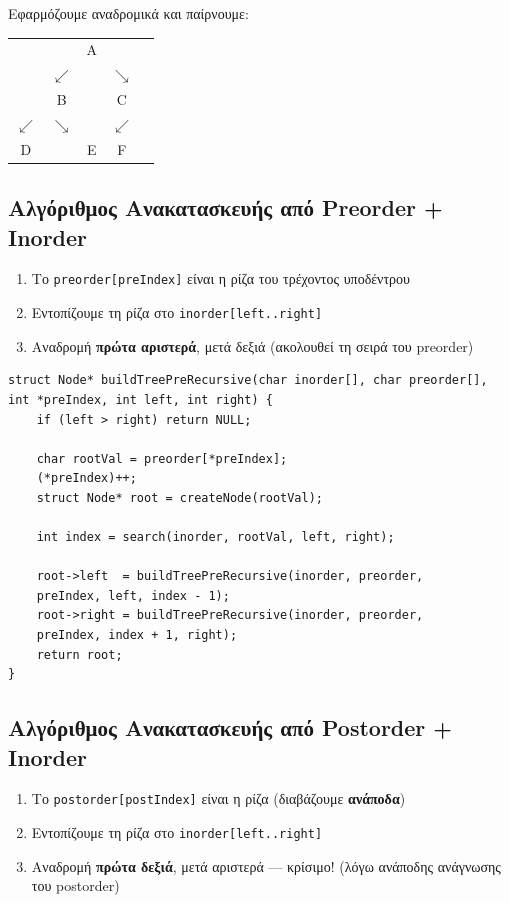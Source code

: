 \documentclass[a4paper,12pt]{article}
\begin{document}
	Εφαρμόζουμε αναδρομικά και παίρνουμε:
	
	\begin{center}
		\begin{tabular}{ccccc}
			& & A & & \\
			& $\swarrow$ & & $\searrow$ & \\
			& B & & C & \\
			$\swarrow$ & $\searrow$ & & $\swarrow$ & \\
			D & & E & F & \\
		\end{tabular}
	\end{center}
	
	\subsection{Αλγόριθμος Ανακατασκευής από Preorder + Inorder}
	
	\begin{enumerate}
		\item Το \texttt{preorder[preIndex]} είναι η ρίζα του τρέχοντος υποδέντρου
		\item Εντοπίζουμε τη ρίζα στο \texttt{inorder[left..right]}
		\item Αναδρομή \textbf{πρώτα αριστερά}, μετά δεξιά 
		(ακολουθεί τη σειρά του preorder)
	\end{enumerate}
	
	\begin{lstlisting}
struct Node* buildTreePreRecursive(char inorder[], char preorder[],
int *preIndex, int left, int right) {
	if (left > right) return NULL;
	
	char rootVal = preorder[*preIndex];
	(*preIndex)++;
	struct Node* root = createNode(rootVal);
	
	int index = search(inorder, rootVal, left, right);
	
	root->left  = buildTreePreRecursive(inorder, preorder,
	preIndex, left, index - 1);
	root->right = buildTreePreRecursive(inorder, preorder,
	preIndex, index + 1, right);
	return root;
}
	\end{lstlisting}
	
	\subsection{Αλγόριθμος Ανακατασκευής από Postorder + Inorder}
	
	\begin{enumerate}
		\item Το \texttt{postorder[postIndex]} είναι η ρίζα (διαβάζουμε \textbf{ανάποδα})
		\item Εντοπίζουμε τη ρίζα στο \texttt{inorder[left..right]}
		\item Αναδρομή \textbf{πρώτα δεξιά}, μετά αριστερά — κρίσιμο! 
		(λόγω ανάποδης ανάγνωσης του postorder)
	\end{enumerate}
	
\end{document}
